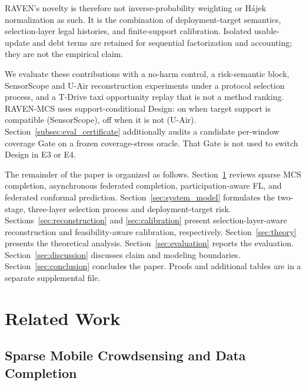 \documentclass[letterpaper,journal]{IEEEtran}
\begin{document}
RAVEN's novelty is therefore not inverse-probability weighting or H\'ajek
normalization as such.  It is the combination of deployment-target semantics,
selection-layer legal histories, and finite-support calibration.
Isolated usable-update and debt terms are retained for sequential
factorization and accounting; they are not the empirical claim.

We evaluate these contributions with a no-harm control, a risk-semantic
block, SensorScope and U-Air reconstruction experiments under a protocol
selection process, and a T-Drive taxi opportunity replay that is not a
method ranking.  RAVEN-MCS uses support-conditional Design: on when
target support is compatible (SensorScope), off when it is not (U-Air).
Section~\ref{subsec:eval_certificate} additionally audits a candidate
per-window coverage Gate on a frozen coverage-stress oracle.  That Gate
is not used to switch Design in E3 or E4.

The remainder of the paper is organized as follows.
Section~\ref{sec:related_work} reviews sparse MCS completion, asynchronous
federated completion, participation-aware FL, and federated conformal
prediction.
Section~\ref{sec:system_model} formulates the two-stage, three-layer selection
process and deployment-target risk.
Sections~\ref{sec:reconstruction} and \ref{sec:calibration} present
selection-layer-aware reconstruction and feasibility-aware calibration,
respectively.
Section~\ref{sec:theory} presents the theoretical analysis.
Section~\ref{sec:evaluation} reports the evaluation.
Section~\ref{sec:discussion} discusses claim and modeling boundaries.
Section~\ref{sec:conclusion} concludes the paper.
Proofs and additional tables are in a separate supplemental file.


\section{Related Work}
\label{sec:related_work}

\subsection{Sparse Mobile Crowdsensing and Data Completion}
\end{document}
